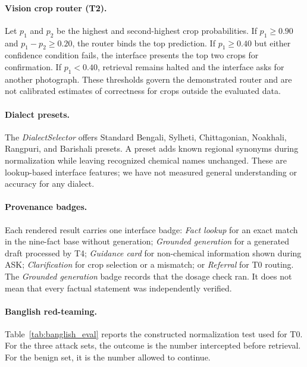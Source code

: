 \documentclass[11pt,a4paper]{article}
\begin{document}
\paragraph{Vision crop router (T2).}
Let $p_1$ and $p_2$ be the highest and second-highest crop probabilities. If $p_1\geq0.90$ and $p_1-p_2\geq0.20$, the router binds the top prediction. If $p_1\geq0.40$ but either confidence condition fails, the interface presents the top two crops for confirmation. If $p_1<0.40$, retrieval remains halted and the interface asks for another photograph. These thresholds govern the demonstrated router and are not calibrated estimates of correctness for crops outside the evaluated data.

\paragraph{Dialect presets.}
The \textit{DialectSelector} offers Standard Bengali, Sylheti, Chittagonian, Noakhali, Rangpuri, and Barishali presets. A preset adds known regional synonyms during normalization while leaving recognized chemical names unchanged. These are lookup-based interface features; we have not measured general understanding or accuracy for any dialect.

\paragraph{Provenance badges.}
Each rendered result carries one interface badge: \emph{Fact lookup} for an exact match in the nine-fact base without generation; \emph{Grounded generation} for a generated draft processed by T4; \emph{Guidance card} for non-chemical information shown during ASK; \emph{Clarification} for crop selection or a mismatch; or \emph{Referral} for T0 routing. The \emph{Grounded generation} badge records that the dosage check ran. It does not mean that every factual statement was independently verified.

\paragraph{Banglish red-teaming.}
Table~\ref{tab:banglish_eval} reports the constructed normalization test used for T0. For the three attack sets, the outcome is the number intercepted before retrieval. For the benign set, it is the number allowed to continue.
\end{document}
